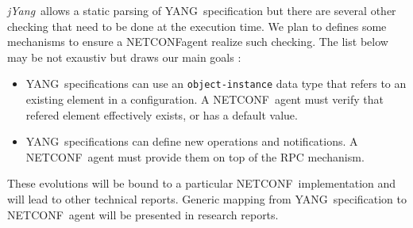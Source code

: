\documentclass[a4paper]{article}
\newcommand{\jyang}{{\sl jYang}}
\newcommand{\nc}{NETCONF}
\newcommand{\y}{YANG}
\begin{document}
\jyang\ allows  a static  parsing of \y\  specification but  there are
several other checking that need to  be done at the execution time. We
plan to  defines some  mechanisms to ensure  a \nc agent  realize such
checking. The list below may be not exaustiv but draws our main goals :
\begin{itemize}
\item
\y\  specifications can  use an  {\tt object-instance}  data  type that
refers to  an existing element in  a configuration. A  \nc\ agent must
verify  that refered  element  effectively exists,  or  has a  default
value.
\item
\y\ specifications can define new operations and notifications. A \nc\
agent must provide them on top of the RPC mechanism.
\end{itemize}

These evolutions will be bound to a particular \nc\ implementation and
will  lead  to  other  technical  reports. Generic  mapping  from  \y\
specification to \nc\ agent will be presented in research reports.



\end{document}
